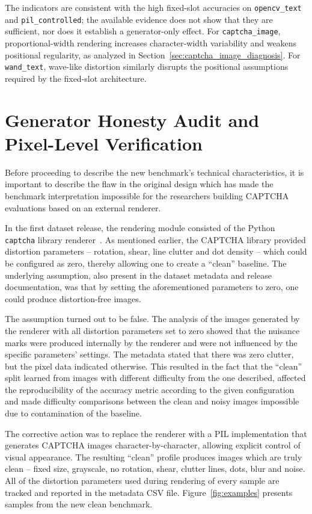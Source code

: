 \documentclass[pdflatex,sn-mathphys-num,iicol]{sn-jnl}
\begin{document}
The indicators are consistent with the high fixed-slot accuracies on
\texttt{opencv\_text} and \texttt{pil\_controlled}; the available evidence does not show that they are sufficient, nor does it establish a generator-only effect.
For \texttt{captcha\_image}, proportional-width rendering increases character-width
variability and weakens positional regularity, as analyzed in
Section~\ref{sec:captcha_image_diagnosis}. For \texttt{wand\_text}, wave-like
distortion similarly disrupts the positional assumptions required by the
fixed-slot architecture.
\section{Generator Honesty Audit and Pixel-Level Verification}
\label{sec:honesty_section}

Before proceeding to describe the new benchmark's technical characteristics, it is important to describe the flaw in the original design which has made the benchmark interpretation impossible for the researchers building CAPTCHA evaluations based on an external renderer.

In the first dataset release, the rendering module consisted of the Python \texttt{captcha} library renderer~\cite{captcha_lib}. As mentioned earlier, the CAPTCHA library provided distortion parameters -- rotation, shear, line clutter and dot density -- which could be configured as zero, thereby allowing one to create a ``clean'' baseline. The underlying assumption, also present in the dataset metadata and release documentation, was that by setting the aforementioned parameters to zero, one could produce distortion-free images.

The assumption turned out to be false. The analysis of the images generated by the renderer with all distortion parameters set to zero showed that the nuisance marks were produced internally by the renderer and were not influenced by the specific parameters' settings. The metadata stated that there was zero clutter, but the pixel data indicated otherwise. This resulted in the fact that the ``clean'' split learned from images with different difficulty from the one described, affected the reproducibility of the accuracy metric according to the given configuration and made difficulty comparisons between the clean and noisy images impossible due to contamination of the baseline.

The corrective action was to replace the renderer with a PIL implementation that generates CAPTCHA images character-by-character, allowing explicit control of visual appearance. The resulting ``clean'' profile produces images which are truly clean -- fixed size, grayscale, no rotation, shear, clutter lines, dots, blur and noise. All of the distortion parameters used during rendering of every sample are tracked and reported in the metadata CSV file. Figure~\ref{fig:examples} presents samples from the new clean benchmark.
\end{document}

